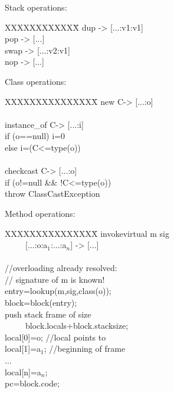 \begin{slide*}
Stack operations:\\

\begin{tt}
\begin{tabbing}
XXXXXXXXXXXX\=\kill
dup    \>[...:v1] -> [...:v1:v1]\\
pop    \>[...:v1] -> [...]\\
swap   \>[...:v1:v2] -> [...:v2:v1]\\
nop    \>[...] -> [...]\\
\end{tabbing}
\end{tt}
\vfil
\end{slide*}

\begin{slide*}
Class operations:\\

\begin{tt}
\begin{tabbing}
XXXXXXXXXXXXXXX\=\kill
new C\>[...] -> [...:o]\\
\\
instance\_of C\>[...:o] -> [...:i]\\
             \>if (o==null) i=0\\
             \>else i=(C<=type(o))\\
\\
checkcast C\>[...:o] -> [...:o]\\
           \>if (o!=null \&\& !C<=type(o))\\
           \>throw ClassCastException\\
\end{tabbing}
\end{tt}
\vfil
\end{slide*}

\begin{slide*}
Method operations:\\
 
\begin{tt}
\begin{tabbing}
XXXXXXXXXXXXXXX\=\kill
invokevirtual m sig\\
~~~~~[...:o:a$_1$:...:a$_n$] -> [...]\\
\\
//overloading already resolved:\\
//   signature of m is known!\\
entry=lookup(m,sig,class(o));\\
block=block(entry);\\
push stack frame of size\\
~~~~~block.locals+block.stacksize;\\
local[0]=o; //local points to\\
local[1]=a$_1$;  //beginning of frame\\
...\\
local[n]=a$_n$;\\
pc=block.code;\\
\end{tabbing}
\end{tt}
\vfil
\end{slide*}

